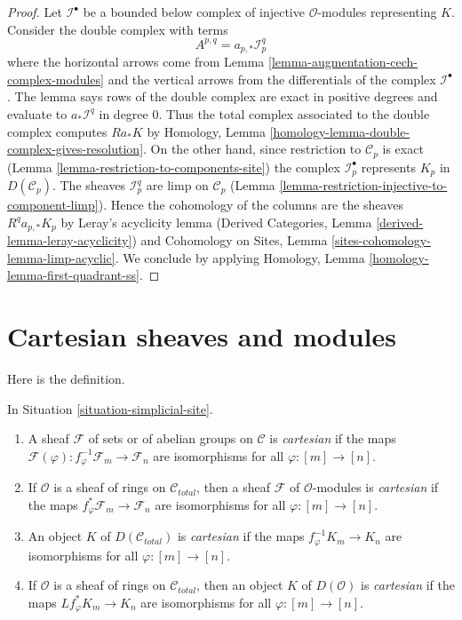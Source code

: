 \begin{proof}
Let $\mathcal{I}^\bullet$ be a bounded below complex of injective
$\mathcal{O}$-modules representing $K$. Consider the double complex with terms
$$
A^{p, q} = a_{p, *}\mathcal{I}^q_p
$$
where the horizontal arrows come from
Lemma \ref{lemma-augmentation-cech-complex-modules}
and the vertical arrows from the differentials of the
complex $\mathcal{I}^\bullet$. The lemma
says rows of the double complex are exact
in positive degrees and evaluate to
$a_*\mathcal{I}^q$ in degree $0$.
Thus the total complex associated to the double complex
computes $Ra_*K$ by
Homology, Lemma \ref{homology-lemma-double-complex-gives-resolution}.
On the other hand, since restriction to $\mathcal{C}_p$ is exact
(Lemma \ref{lemma-restriction-to-components-site})
the complex $\mathcal{I}_p^\bullet$ represents $K_p$ in
$D(\mathcal{C}_p)$. The sheaves $\mathcal{I}_p^q$
are limp on $\mathcal{C}_p$
(Lemma \ref{lemma-restriction-injective-to-component-limp}).
Hence the cohomology of the columns are the sheaves
$R^qa_{p, *}K_p$ by Leray's acyclicity lemma
(Derived Categories, Lemma \ref{derived-lemma-leray-acyclicity})
and
Cohomology on Sites, Lemma \ref{sites-cohomology-lemma-limp-acyclic}.
We conclude by applying
Homology, Lemma \ref{homology-lemma-first-quadrant-ss}.
\end{proof}





\section{Cartesian sheaves and modules}
\label{section-cartesian}

\noindent
Here is the definition.

\begin{definition}
\label{definition-cartesian-sheaf}
In Situation \ref{situation-simplicial-site}.
\begin{enumerate}
\item A sheaf $\mathcal{F}$ of sets or of abelian groups on
$\mathcal{C}$ is {\it cartesian} if the maps
$\mathcal{F}(\varphi) : f_\varphi^{-1}\mathcal{F}_m \to \mathcal{F}_n$
are isomorphisms for all $\varphi : [m] \to [n]$.
\item If $\mathcal{O}$ is a sheaf of rings on $\mathcal{C}_{total}$,
then a sheaf $\mathcal{F}$ of $\mathcal{O}$-modules is
{\it cartesian} if  the maps $f_\varphi^*\mathcal{F}_m \to \mathcal{F}_n$
are isomorphisms for all $\varphi : [m] \to [n]$.
\item An object $K$ of $D(\mathcal{C}_{total})$ is {\it cartesian} if the maps
$f_\varphi^{-1}K_m \to K_n$
are isomorphisms for all $\varphi : [m] \to [n]$.
\item If $\mathcal{O}$ is a sheaf of rings on $\mathcal{C}_{total}$, then
an object $K$ of $D(\mathcal{O})$ is {\it cartesian} if the maps
$Lf_\varphi^*K_m \to K_n$
are isomorphisms for all $\varphi : [m] \to [n]$.
\end{enumerate}
\end{definition}

